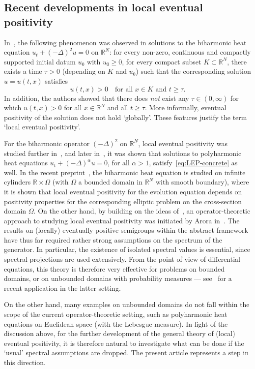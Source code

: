 \documentclass[sn-mathphys]{sn-jnl}%
\theoremstyle{thmstyleone}
\theoremstyle{thmstylethree}
\newcommand{\RR}{\mathbb{R}}
\begin{document}
\subsection*{Recent developments in local eventual positivity}
\label{sec:LEP-background}
In~\cite{GG-lep}, the following phenomenon was observed in solutions to the biharmonic heat equation $u_t + (-\Delta)^2 u=0$ on $\RR^N$: for every non-zero, continuous and compactly supported initial datum $u_0$ with $u_0\ge 0$, for every compact subset $K\subset\RR^N$, there exists a time $\tau>0$ (depending on $K$ and $u_0$) such that the corresponding solution $u=u(t,x)$ satisfies
\begin{equation}
	\label{eq:LEP-concrete}
	u(t,x) > 0 \quad\text{for all } x \in K\text{ and } t\ge\tau.
\end{equation}
In addition, the authors showed that there does \emph{not} exist any $\tau\in (0,\infty)$ for which $u(t,x)>0$ for all $x\in\RR^N$ and all $t\ge\tau$. More informally, eventual positivity of the solution does not hold `globally'. These features justify the term `local eventual positivity'.

For the biharmonic operator $(-\Delta)^2$ on $\RR^N$, local eventual positivity was studied further in~\cite{FGG}, and later in~\cite{FF-lep}, it was shown that solutions to polyharmonic heat equations $u_t + (-\Delta)^\alpha u=0$, for all $\alpha>1$, satisfy~\eqref{eq:LEP-concrete} as well. In the recent preprint~\cite{DGM}, the biharmonic heat equation is studied on infinite cylinders $\RR\times\Omega$ (with $\Omega$ a bounded domain in $\RR^N$ with smooth boundary), where it is shown that local eventual positivity for the evolution equation depends on positivity properties for the corresponding elliptic problem on the cross-section domain $\Omega$. On the other hand, by building on the ideas of~\cite{DGK2,DG18}, an operator-theoretic approach to studying local eventual positivity was initiated by Arora in~\cite{Ar21}. The results on (locally) eventually positive semigroups within the abstract framework have thus far required rather strong assumptions on the spectrum of the generator. In particular, the existence of isolated spectral values is essential, since spectral projections are used extensively. From the point of view of differential equations, this theory is therefore very effective for problems on bounded domains, or on unbounded domains with probability measures --- see~\cite[Section 3.2]{AGRT} for a recent application in the latter setting. 

On the other hand, many examples on unbounded domains do not fall within the scope of the current operator-theoretic setting, such as polyharmonic heat equations on Euclidean space (with the Lebesgue measure). In light of the discussion above, for the further development of the general theory of (local) eventual positivity, it is therefore natural to investigate what can be done if the `usual' spectral assumptions are dropped. The present article represents a step in this direction.
\end{document}
